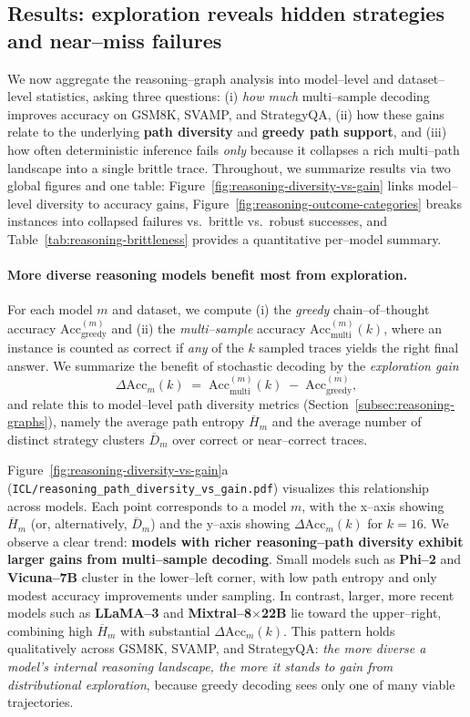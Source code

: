 \subsection{Results: exploration reveals hidden strategies and near--miss failures}
\label{subsec:reasoning-results}

We now aggregate the reasoning--graph analysis into model--level and
dataset--level statistics, asking three questions:
(i) \emph{how much} multi--sample decoding improves accuracy on GSM8K,
SVAMP, and StrategyQA,
(ii) how these gains relate to the underlying \textbf{path diversity}
and \textbf{greedy path support}, and
(iii) how often deterministic inference fails \emph{only} because it
collapses a rich multi--path landscape into a single brittle trace.
Throughout, we summarize results via two global figures and one table:
Figure~\ref{fig:reasoning-diversity-vs-gain} links model--level
diversity to accuracy gains,
Figure~\ref{fig:reasoning-outcome-categories} breaks instances into
collapsed failures vs.\ brittle vs.\ robust successes, and
Table~\ref{tab:reasoning-brittleness} provides a quantitative
per--model summary.

\paragraph{More diverse reasoning models benefit most from exploration.}
For each model $m$ and dataset, we compute (i) the
\emph{greedy} chain--of--thought accuracy
$\mathrm{Acc}_{\mathrm{greedy}}^{(m)}$ and (ii) the
\emph{multi--sample} accuracy
$\mathrm{Acc}_{\mathrm{multi}}^{(m)}(k)$, where an instance is
counted as correct if \emph{any} of the $k$ sampled traces yields the
right final answer.
We summarize the benefit of stochastic decoding by the
\emph{exploration gain}
\[
  \Delta \mathrm{Acc}_m(k)
  \;=\;
  \mathrm{Acc}_{\mathrm{multi}}^{(m)}(k)
  \;-\;
  \mathrm{Acc}_{\mathrm{greedy}}^{(m)},
\]
and relate this to model--level path diversity metrics
(Section~\ref{subsec:reasoning-graphs}), namely the average path
entropy $\overline{H}_m$ and the average number of distinct
strategy clusters $\overline{D}_m$ over correct or near--correct
traces.

Figure~\ref{fig:reasoning-diversity-vs-gain}a
(\texttt{ICL/reasoning\_path\_diversity\_vs\_gain.pdf}) visualizes this
relationship across models.
Each point corresponds to a model $m$, with the x--axis showing
$\overline{H}_m$ (or, alternatively, $\overline{D}_m$) and the y--axis
showing $\Delta \mathrm{Acc}_m(k)$ for $k{=}16$.
We observe a clear trend: \textbf{models with richer reasoning--path
diversity exhibit larger gains from multi--sample decoding}.
Small models such as \textbf{Phi--2} and \textbf{Vicuna--7B} cluster in
the lower--left corner, with low path entropy and only modest
accuracy improvements under sampling.
In contrast, larger, more recent models such as
\textbf{LLaMA--3} and \textbf{Mixtral--8$\times$22B} lie toward the
upper--right, combining high $\overline{H}_m$ with substantial
$\Delta \mathrm{Acc}_m(k)$.
This pattern holds qualitatively across GSM8K, SVAMP, and StrategyQA:
\emph{the more diverse a model’s internal reasoning landscape, the more
it stands to gain from distributional exploration}, because greedy
decoding sees only one of many viable trajectories.

